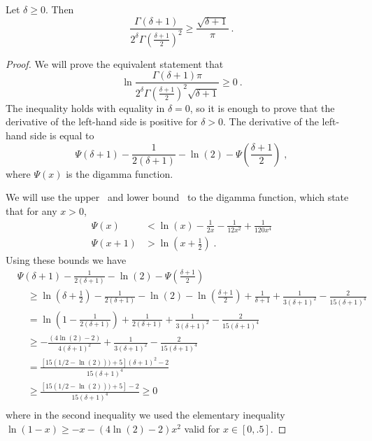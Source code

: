 \begin{lemma}
\label{lemma:ratio_gamma}
Let $\delta \geq 0$. Then
\[
\frac{\Gamma(\delta+1)}{2^\delta \Gamma(\frac{\delta+1}{2})^2}
\geq \frac{\sqrt{\delta+1}}{\pi}~.
\]
\end{lemma}
%
\begin{proof}
We will prove the equivalent statement that
\[
\ln \frac{\Gamma(\delta+1) \pi}{2^\delta \Gamma(\frac{\delta+1}{2})^2 \sqrt{\delta+1}} \geq 0~.
\]
The inequality holds with equality in $\delta=0$, so it is enough to prove that
the derivative of the left-hand side is positive for $\delta > 0$. The
derivative of the left-hand side is equal to
\[
\Psi(\delta+1) - \frac{1}{2(\delta+1)} -\ln(2) - \Psi\left(\frac{\delta+1}{2} \right) \; ,
\]
where $\Psi(x)$ is the digamma function.

We will use the upper~\citep{Chen-2005} and lower bound~\citep{Batir-2008}
to the digamma function, which state that for any $x>0$,
\begin{align*}
\Psi(x) &< \ln(x) -\frac{1}{2x} -\frac{1}{12 x^2} +\frac{1}{120 x^4} \\
\Psi(x+1) &> \ln \left(x+\frac{1}{2} \right) \; .
\end{align*}
Using these bounds we have
\begin{align*}
&\Psi(\delta+1) - \frac{1}{2(\delta+1)} - \ln(2) - \Psi \left(\frac{\delta+1}{2} \right) \\
&\quad \ge \ln \left(\delta+\frac{1}{2} \right) - \frac{1}{2(\delta+1)} -\ln(2) -\ln \left(\frac{\delta+1}{2}\right) + \frac{1}{\delta+1} +\frac{1}{3 (\delta+1)^2} -\frac{2}{15 (\delta+1)^4}\\
&\quad = \ln \left(1-\frac{1}{2(\delta+1)} \right)+ \frac{1}{2(\delta+1)}+\frac{1}{3 (\delta+1)^2} -\frac{2}{15 (\delta+1)^4}\\
&\quad \ge - \frac{(4\ln(2)-2)}{4(\delta+1)^2}+\frac{1}{3 (\delta+1)^2}-\frac{2}{15 (\delta+1)^4}\\
&\quad = \frac{[15(1/2-\ln(2)))+5](\delta+1)^2-2}{15 (\delta+1)^4}\\
&\quad \ge \frac{[15(1/2-\ln(2)))+5]-2}{15 (\delta+1)^4}\geq0\\
\end{align*}
where in the second inequality we used the elementary inequality $\ln(1-x) \geq -x - (4\ln(2)-2)x^2$ valid for $x \in [0,.5]$.
\end{proof}

